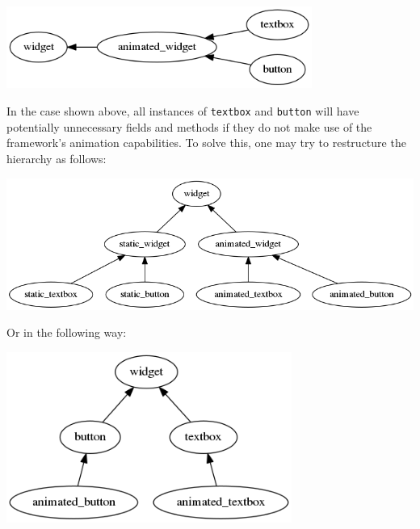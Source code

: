 \documentclass[twoside, 12pt, a4paper, openany]{book}
\let\origfigure=\figure
\let\endorigfigure=\endfigure
\renewenvironment{figure}[1][]{%
\origfigure[H]
}{%
\endorigfigure
}
\begin{document}
\begin{figure}[htbp]
\centering
\includegraphics[width=0.75000\textwidth]{source/figures/generated/ecs/overview/oop/repetition_problem_0.png}
\caption{OOP encoding issue: repetition \#0}
\end{figure}

In the case shown above, all instances of
\texttt{textbox}
and
\texttt{button}
will have potentially unnecessary fields and methods if they do not make
use of the framework's animation capabilities. To solve this, one may
try to restructure the hierarchy as follows:

\begin{figure}[htbp]
\centering
\includegraphics{source/figures/generated/ecs/overview/oop/repetition_problem_1.png}
\caption{OOP encoding issue: repetition \#1}
\end{figure}

Or in the following way:

\begin{figure}[htbp]
\centering
\includegraphics[width=0.70000\textwidth]{source/figures/generated/ecs/overview/oop/repetition_problem_2.png}
\caption{OOP encoding issue: repetition \#2}
\end{figure}
\end{document}
